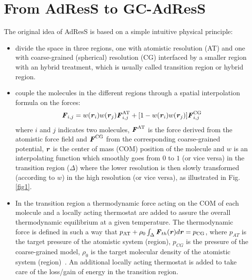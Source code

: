 \documentclass[a4paper,preprint,unsortedaddress]{revtex4-1}
\newcommand{\recheck}[1]{{\color{red} #1}}
\newcommand{\vect}[1]{\textbf{\textit{#1}}}
\newcommand{\AT}{{\textrm{{AT}}}}
\newcommand{\CG}{{\textrm{CG}}}
\begin{document}
\section{From AdResS to GC-AdResS}
The original idea of AdResS is based on a simple intuitive physical principle:
\begin{itemize}
\item divide the space in three regions, one with atomistic resolution (AT) and one with coarse-grained (spherical) resolution (CG) interfaced by a smaller region with an hybrid treatment, which is usually called transition region or hybrid region.
\item couple the molecules in the different regions through a spatial interpolation formula on the forces:
\begin{equation}
{\vect F}_{i,j}=w(\vect r_i)w(\vect r_j){\vect
  F}_{i,j}^{\AT}+[1-w(\vect r_i)w(\vect r_j)]{\vect F}^{\CG}_{i,j} 
\label{eqforce}
\end{equation}
where $i$ and $j$ indicates two molecules, ${\vect F}^{\AT}$ is the
force derived from the atomistic force field and  ${\vect F}^{\CG}$
from the corresponding coarse-grained potential, \recheck{$\vect r$ is the center of mass (COM) position of}
the molecule and $w$ is an interpolating function which smoothly goes from $0$
to $1$ (or vice versa) in the transition region ($\Delta$) where the lower resolution is then
slowly transformed (according to $w$) in the high resolution (or vice versa),
as illustrated in Fig.\ref{fig1}.
\item In the transition region a thermodynamic force acting on the COM of each molecule and a locally acting thermostat are added to assure the overall thermodynamic equilibrium at a given temperature. The thermodynamic force is defined in such a way that
  $p_{\AT}+\rho_{0}\int_{\Delta}{\vect F}_{th}({\vect r})d{\vect r}=p_{\CG}$,
  where $p_{AT}$  is the target pressure of the atomistic system (region), $p_{CG}$ is the pressure of the coarse-grained model, $\rho_{0}$ is the target molecular density of the atomistic system (region)~\cite{prl12}. An additional locally acting thermostat is added to take care of the loss/gain of energy in the transition region.
\end{itemize}
\end{document}
